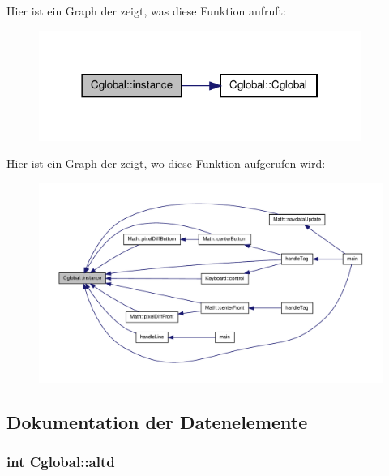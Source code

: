 Hier ist ein Graph der zeigt, was diese Funktion aufruft:\nopagebreak
\begin{figure}[H]
\begin{center}
\leavevmode
\includegraphics[width=298pt]{class_cglobal_a0e96a5f7f00ef5a151da708a17340f08_cgraph}
\end{center}
\end{figure}




Hier ist ein Graph der zeigt, wo diese Funktion aufgerufen wird:
\nopagebreak
\begin{figure}[H]
\begin{center}
\leavevmode
\includegraphics[width=400pt]{class_cglobal_a0e96a5f7f00ef5a151da708a17340f08_icgraph}
\end{center}
\end{figure}




\subsection{Dokumentation der Datenelemente}
\hypertarget{class_cglobal_a0e2d4712edf675715bd4bcc554dbcf42}{
\subsubsection[{altd}]{\setlength{\rightskip}{0pt plus 5cm}int {\bf Cglobal::altd}}}
\label{class_cglobal_a0e2d4712edf675715bd4bcc554dbcf42}


